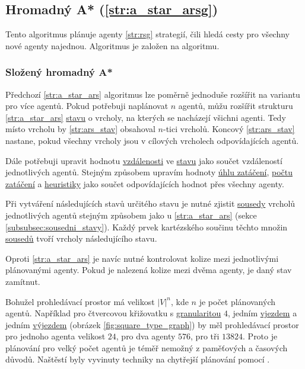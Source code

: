 \subsection{Hromadný A* (\ref{str:a_star_arsg})}\label{subsec:hromadny_a_star}


Tento algoritmus plánuje agenty \ref{str:rsg} strategií, čili hledá cesty pro všechny nové agenty najednou.
Algoritmus je založen na  algoritmu.

\subsubsection{Složený hromadný A*}\label{subsubsec:arsg_slozeny_hromadny}
Předchozí \ref{str:a_star_ars} algoritmus lze poměrně jednoduše rozšířit na variantu pro více agentů.
Pokud potřebuji naplánovat $n$ agentů, můžu rozšířit strukturu \ref{str:a_star_ars}
\hyperref[str:ars_stav]{stavu} o vrcholy, na kterých se nacházejí všichni agenti.
Tedy místo vrcholu by \ref{str:ars_stav} obsahoval $n$-tici vrcholů.
Koncový \ref{str:ars_stav} nastane, pokud všechny vrcholy jsou v cílových vrcholech odpovídajících agentů.

Dále potřebuji upravit hodnotu \hyperref[par:ars_vzdalenost]{vzdálenosti} ve \hyperref[str:ars_stav]{stavu}
jako součet vzdáleností jednotlivých agentů.
Stejným způsobem upravím hodnoty \hyperref[par:ars_uhel_zataceni]{úhlu zatáčení},
\hyperref[par:ars_pocet_zataceni]{počtu zatáčení} a \hyperref[par:ars_heuristika]{heuristiky} jako součet
odpovídajících hodnot přes všechny agenty.

Při vytváření následujících stavů určitého stavu je nutné zjistit \hyperref[str:ars_sousedi]{sousedy} vrcholů
jednotlivých agentů stejným způsobem jako u \ref{str:a_star_ars} (sekce \ref{subsubsec:sousedni_stavy}).
Každý prvek kartézského součinu těchto množin \hyperref[str:ars_sousedi]{sousedů} tvoří vrcholy následujícího stavu.

Oproti \ref{str:a_star_ars} je navíc nutné kontrolovat kolize mezi jednotlivými plánovanými agenty.
Pokud je nalezená kolize mezi dvěma agenty, je daný stav zamítnut.

Bohužel prohledávací prostor má velikost $|V|^n$, kde $n$ je počet plánovaných agentů.
Například pro čtvercovou křižovatku s \hyperref[par:granularita]{granularitou} $4$,
jedním \hyperref[par:vjezdy]{vjezdem} a jedním \hyperref[par:vyjezdy]{výjezdem} (obrázek \ref{fig:square_type_graph})
by měl prohledávací prostor pro jednoho agenta velikost $24$, pro dva agenty $576$, pro tři $13824$.
Proto je plánování pro velký počet agentů je téměř nemožný z paměťových a časových důvodů.
Naštěstí byly vyvinuty techniky na chytřejší plánování pomocí .


